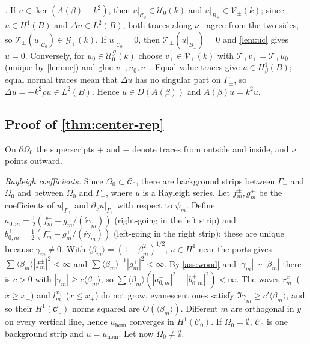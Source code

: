\emph{.} If $u\in\ker(A(\beta)-k^2)$, then
$u|_{\mathcal C_0}\in\mathcal U_0(k)$ and $u|_{B_\pm}\in\mathcal V_\pm(k)$; since
$u\in H^1(B)$ and $\Delta u\in L^2(B)$, both traces along $\nu_\pm$ agree from
the two sides, so $\mathscr T_\pm(u|_{\mathcal C_0})\in\mathcal G_\pm(k)$.
If $u|_{\mathcal C_0}=0$, then $\mathscr T_\pm(u|_{B_\pm})=0$ and
\cref{lem:uc} gives $u=0$. Conversely, for
$u_0\in\mathcal U_0^{\mathcal G}(k)$ choose $v_\pm\in\mathcal V_\pm(k)$ with
$\mathscr T_\pm v_\pm=\mathscr T_\pm u_0$ (unique by \cref{lem:uc}) and glue
$v_-,u_0,v_+$. Equal value traces give $u\in H^1_\beta(B)$; equal normal traces
mean that $\Delta u$ has no singular part on $\Gamma_\pm$, so
$\Delta u=-k^2\rho u\in L^2(B)$. Hence $u\in D(A(\beta))$ and $A(\beta)u=k^2u$.

\subsection{Proof of \texorpdfstring{\cref{thm:center-rep}}{Theorem 4.2}}\label{sm:proof-center-rep}
On $\partial\Omega_0$ the superscripts $+$ and $-$ denote traces from outside and
inside, and $\nu$ points outward.

\emph{Rayleigh coefficients.} Since $\overline{\Omega_0}\subset\mathcal C_0$,
there are background strips between $\Gamma_-$ and $\Omega_0$ and between
$\Omega_0$ and $\Gamma_+$, where $u$ is a Rayleigh series. Let $f^\pm_m,g^\pm_m$ be
the coefficients of $u|_{\Gamma_\pm}$ and $\partial_xu|_{\Gamma_\pm}$ with respect
to $\psi_m$. Define $a^-_{0,m}=\frac12(f^-_m+g^-_m/(\ii\gamma_m))$ (right-going in
the left strip) and $b^+_{0,m}=\frac12(f^+_m-g^+_m/(\ii\gamma_m))$ (left-going in the
right strip); these are unique because $\gamma_m\ne0$. With
$\langle\beta_m\rangle=(1+\beta_m^2)^{1/2}$, $u\in H^1$ near the ports gives
$\sum\langle\beta_m\rangle|f^\pm_m|^2<\infty$ and
$\sum\langle\beta_m\rangle^{-1}|g^\pm_m|^2<\infty$. By \cref{ass:wood} and
$|\gamma_m|\sim|\beta_m|$ there is $c>0$ with $|\gamma_m|\ge c\langle\beta_m\rangle$,
so $\sum\langle\beta_m\rangle(|a^-_{0,m}|^2+|b^+_{0,m}|^2)<\infty$. The waves
$r^{x_-}_m$ ($x\ge x_-$) and $l^{x_+}_m$ ($x\le x_+$) do not grow, evanescent ones
satisfy $\Im\gamma_m\ge c'\langle\beta_m\rangle$, and so their $H^1(\mathcal C_0)$
norms squared are $O(\langle\beta_m\rangle)$. Different $m$ are orthogonal in $y$
on every vertical line, hence $u_{\mathrm{hom}}$ converges in $H^1(\mathcal C_0)$.
If $\Omega_0=\emptyset$, $\mathcal C_0$ is one background strip and
$u=u_{\mathrm{hom}}$. Let now $\Omega_0\ne\emptyset$.

